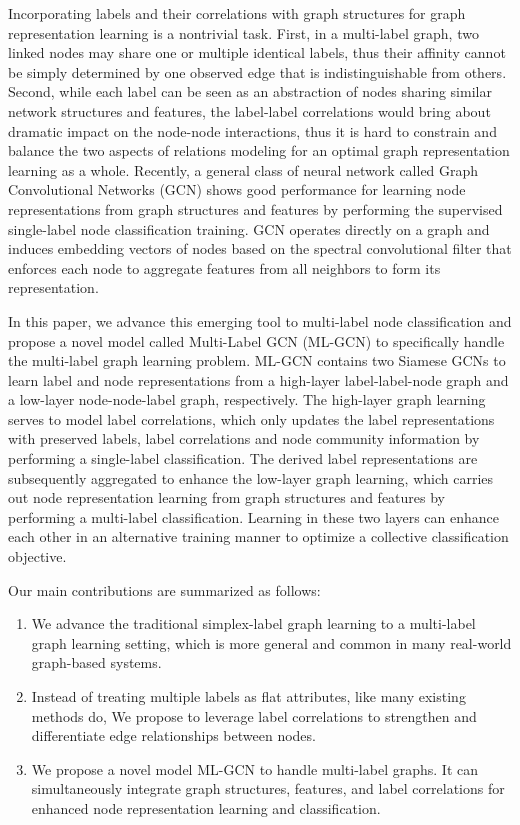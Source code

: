 \documentclass[conference]{IEEEtran}
\begin{document}
Incorporating labels and their correlations with graph structures for graph representation learning is a nontrivial task. First, in a multi-label graph, two linked nodes may share one or multiple identical labels, thus their affinity cannot be simply determined by one observed edge that is indistinguishable from others. Second, while each label can be seen as an abstraction of nodes sharing similar network structures and features, the label-label correlations would bring about dramatic impact on the node-node interactions, thus it is hard to constrain and balance the two aspects of relations modeling for an optimal graph representation learning as a whole. Recently, a general class of neural network called Graph Convolutional Networks (GCN) \cite{14} shows good performance for learning node representations from graph structures and features by performing the supervised single-label node classification training. GCN operates directly on a graph and induces embedding vectors of nodes based on the spectral convolutional filter that enforces each node to aggregate features from all neighbors to form its representation. 

In this paper, we advance this emerging tool to multi-label node classification and propose a novel model called Multi-Label GCN (ML-GCN) to specifically handle the multi-label graph learning problem. ML-GCN contains two Siamese GCNs to learn label and node representations from a high-layer label-label-node graph and a low-layer node-node-label graph, respectively. The high-layer graph learning serves to model label correlations, which only updates the label representations with preserved labels, label correlations and node community information by performing a single-label classification. The derived label representations are subsequently aggregated to enhance the low-layer graph learning, which carries out node representation learning from graph structures and features by performing a multi-label classification. Learning in these two layers can enhance each other in an alternative training manner to optimize a collective classification objective.


Our main contributions are summarized as follows: 

\begin{enumerate}
    \item We advance the traditional simplex-label graph learning to a multi-label graph learning setting, which is more general and common in many real-world graph-based systems.
    \item Instead of treating multiple labels as flat attributes, like many existing methods do, We propose to leverage label correlations to strengthen and differentiate edge relationships between nodes.
    \item We propose a novel model ML-GCN to handle multi-label graphs. It can simultaneously integrate graph structures, features, and label correlations for enhanced node representation learning and classification.
\end{enumerate}
\end{document}
